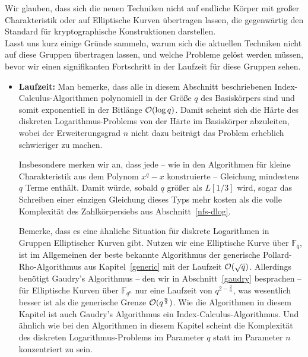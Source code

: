 \begin{refsegment}
 Wir glauben, dass sich die neuen Techniken nicht auf endliche Körper mit großer Charakteristik oder auf Elliptische Kurven übertragen lassen, die gegenwärtig den Standard für kryptographische Konstruktionen darstellen.\\[0.1cm]

Lasst uns kurz einige Gründe sammeln, warum sich die aktuellen Techniken nicht auf diese Gruppen übertragen lassen, und welche Probleme gelöst werden müssen, bevor wir einen signifikanten Fortschritt in der Laufzeit für diese Gruppen sehen.

\begin{itemize}
\item {\bf Laufzeit:} Man bemerke, dass alle in diesem Abschnitt beschriebenen Index-Calculus-Algorithmen polynomiell in der Größe $q$ des Basiskörpers sind und somit exponentiell in der Bitlänge ${\cal O}(\log q)$. Damit scheint sich die Härte des diskreten Logarithmus-Problems von der Härte im Basiskörper abzuleiten, wobei der Erweiterungsgrad $n$ nicht dazu beiträgt das Problem erheblich schwieriger zu machen.

Insbesondere merken wir an, dass jede -- wie in den Algorithmen für kleine Charakteristik aus dem Polynom $x^q-x$ konstruierte -- Gleichung mindestens $q$ Terme enthält. Damit würde, sobald $q$ größer als $L[1/3]$ wird, sogar das Schreiben einer einzigen Gleichung dieses Typs mehr kosten als die volle Komplexität des Zahlkörpersiebs aus Abschnitt~\ref{nfs-dlog}.

Bemerke, dass es eine ähnliche Situation für diskrete Logarithmen in Gruppen Elliptischer Kurven gibt. Nutzen wir eine Elliptische Kurve über $\mathbb{F}_q$, ist im Allgemeinen der beste bekannte Algorithmus der generische Pollard-Rho-Algorithmus aus Kapitel~\ref{generic} mit der Laufzeit ${\cal O}(\sqrt q)$. Allerdings benötigt Gaudry's Algorithmus -- den wir in Abschnitt~\ref{gaudry} besprachen -- für Elliptische Kurven über $\mathbb{F}_{q^n}$ nur eine Laufzeit von $q^{2-\frac 2 n}$, was wesentlich besser ist als die generische Grenze ${\cal O}(q^{\frac n 2})$. Wie die Algorithmen in diesem Kapitel ist auch Gaudry's Algorithmus ein Index-Calculus-Algorithmus. Und ähnlich wie bei den Algorithmen in diesem Kapitel scheint die Komplexität des diskreten Logarithmus-Problems im Parameter $q$ statt im Parameter $n$ konzentriert zu sein.


\end{itemize}
\end{refsegment}
